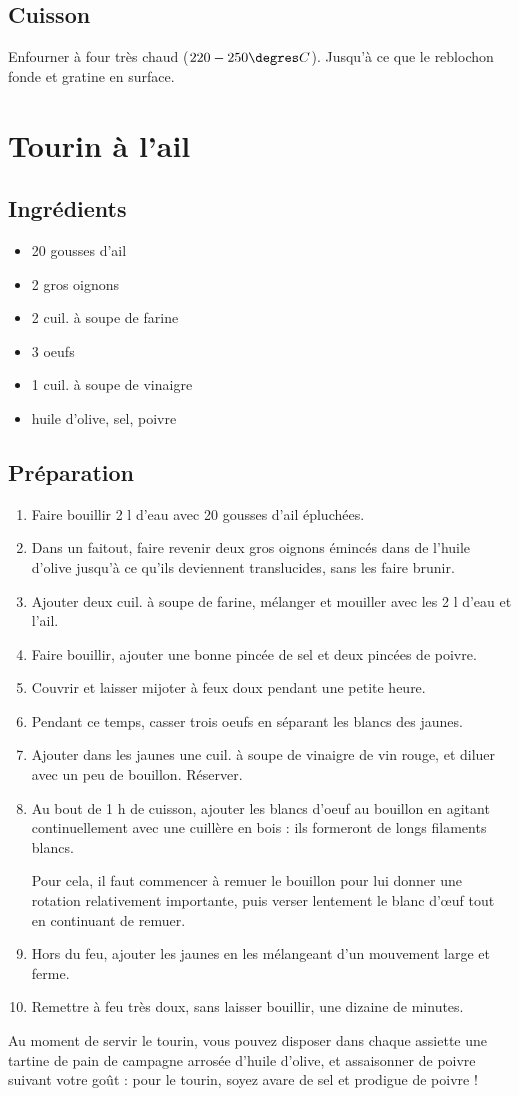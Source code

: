 \subsection*{Cuisson}
Enfourner à four très chaud ($220-250\degres C$). Jusqu'à ce que le reblochon fonde et gratine en surface.

\newpage
\section{Tourin à l'ail}
\subsection*{Ingrédients}
\begin{itemize}
\item 20 gousses d'ail
\item 2 gros oignons
\item 2 cuil. à soupe de farine
\item 3 oeufs
\item 1 cuil. à soupe de vinaigre
\item huile d'olive, sel, poivre
\end{itemize}
\subsection*{Préparation}
\begin{enumerate}
\item Faire bouillir 2 l d'eau avec 20 gousses d'ail épluchées.
\item Dans un faitout, faire revenir deux gros oignons émincés dans de l'huile d'olive jusqu'à ce qu'ils deviennent translucides, sans les faire brunir.
\item Ajouter deux cuil. à soupe de farine, mélanger et mouiller avec les 2 l d'eau et l'ail.
\item Faire bouillir, ajouter une bonne pincée de sel et deux pincées de poivre.
\item Couvrir et laisser mijoter à feux doux pendant une petite heure.
\item Pendant ce temps, casser trois oeufs en séparant les blancs des jaunes.
\item Ajouter dans les jaunes une cuil. à soupe de vinaigre de vin rouge, et diluer avec un peu de bouillon. Réserver.
\item Au bout de 1 h de cuisson, ajouter les blancs d'oeuf au bouillon en agitant continuellement avec une cuillère en bois : ils formeront de longs filaments blancs.
\begin{remarque}
Pour cela, il faut commencer à remuer le bouillon pour lui donner une rotation relativement importante, puis verser lentement le blanc d'œuf tout en continuant de remuer.
\end{remarque}
\item Hors du feu, ajouter les jaunes en les mélangeant d'un mouvement large et ferme.
\item Remettre à feu très doux, sans laisser bouillir, une dizaine de minutes.
\end{enumerate}

\begin{remarque}
Au moment de servir le tourin, vous pouvez disposer dans chaque assiette une tartine de pain de campagne arrosée d'huile d'olive, et assaisonner de poivre suivant votre goût : pour le tourin, soyez avare de sel et prodigue de poivre !
\end{remarque}